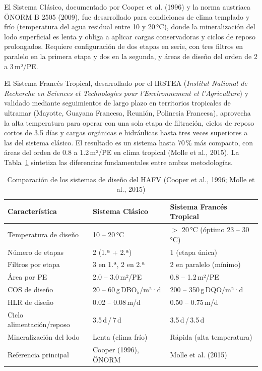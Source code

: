 \documentclass[12pt,a4paper]{article}
\begin{document}
El Sistema Clásico, documentado por Cooper et al. (1996) y la norma austriaca ÖNORM B 2505 (2009), fue desarrollado para condiciones de clima templado y frío (temperatura del agua residual entre 10 y 20\,°C), donde la mineralización del lodo superficial es lenta y obliga a aplicar cargas conservadoras y ciclos de reposo prolongados. Requiere configuración de dos etapas en serie, con tres filtros en paralelo en la primera etapa y dos en la segunda, y áreas de diseño del orden de 2 a 3\,m²/PE.

El Sistema Francés Tropical, desarrollado por el IRSTEA (\textit{Institut National de Recherche en Sciences et Technologies pour l'Environnement et l'Agriculture}) y validado mediante seguimientos de largo plazo en territorios tropicales de ultramar (Mayotte, Guayana Francesa, Reunión, Polinesia Francesa), aprovecha la alta temperatura para operar con una sola etapa de filtración, ciclos de reposo cortos de 3.5 días y cargas orgánicas e hidráulicas hasta tres veces superiores a las del sistema clásico. El resultado es un sistema hasta 70\,\% más compacto, con áreas del orden de 0.8 a 1.2\,m²/PE en clima tropical (Molle et al., 2015). La Tabla~\ref{tab:comparacion_sistemas} sintetiza las diferencias fundamentales entre ambas metodologías.

\begin{table}[H]
\centering
\caption{Comparación de los sistemas de diseño del HAFV (Cooper et al., 1996; Molle et al., 2015)}
\label{tab:comparacion_sistemas}
\begin{tabular}{p{4.8cm}p{4.2cm}p{4.2cm}}
\toprule
\textbf{Característica} & \textbf{Sistema Clásico} & \textbf{Sistema Francés Tropical} \\
\midrule
Temperatura de diseño & 10 -- 20\,°C & $>$ 20\,°C (óptimo 23 -- 30\,°C) \\
Número de etapas & 2 (1.ª + 2.ª) & 1 (etapa única) \\
Filtros por etapa & 3 en 1.ª, 2 en 2.ª & 2 en paralelo (mínimo) \\
Área por PE & 2.0 -- 3.0\,m²/PE & 0.8 -- 1.2\,m²/PE \\
COS de diseño & 20 -- 60\,g\,DBO$_5$/m²·d & 200 -- 350\,g\,DQO/m²·d \\
HLR de diseño & 0.02 -- 0.08\,m/d & 0.50 -- 0.75\,m/d \\
Ciclo alimentación/reposo & 3.5\,d\,/\,7\,d & 3.5\,d\,/\,3.5\,d \\
Mineralización del lodo & Lenta (clima frío) & Rápida (alta temperatura) \\
Referencia principal & Cooper (1996), ÖNORM & Molle et al. (2015) \\
\bottomrule
\end{tabular}
\end{table}
\end{document}

